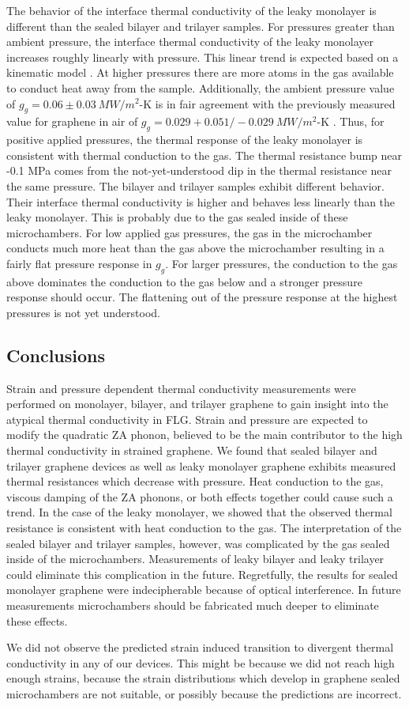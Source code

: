 The behavior of the interface thermal conductivity of the leaky monolayer is different than the sealed bilayer and trilayer samples.
For pressures greater than ambient pressure, the interface thermal conductivity of the leaky monolayer increases roughly linearly with pressure.
This linear trend is expected based on a kinematic model \cite{Chen2011a}.
At higher pressures there are more atoms in the gas available to conduct heat away from the sample.
Additionally, the ambient pressure value of $g_g = 0.06 \pm 0.03 \ MW/m^2$-K is in fair agreement with the previously measured value for graphene in air of $g_g = 0.029+0.051/-0.029 \ MW/m^2$-K \cite{Chen2011a}.
Thus, for positive applied pressures, the thermal response of the leaky monolayer is consistent with thermal conduction to the gas.
The thermal resistance bump near -0.1 MPa comes from the not-yet-understood dip in the thermal resistance near the same pressure.
The bilayer and trilayer samples exhibit different behavior.
Their interface thermal conductivity is higher and behaves less linearly than the leaky monolayer.
This is probably due to the gas sealed inside of these microchambers.
For low applied gas pressures, the gas in the microchamber conducts much more heat than the gas above the microchamber resulting in a fairly flat pressure response in $g_g$.
For larger pressures, the conduction to the gas above dominates the conduction to the gas below and a stronger pressure response should occur.
The flattening out of the pressure response at the highest pressures is not yet understood.

\subsection{Conclusions}
Strain and pressure dependent thermal conductivity measurements were performed on monolayer, bilayer, and trilayer graphene to gain insight into the atypical thermal conductivity in FLG.
Strain and pressure are expected to modify the quadratic ZA phonon, believed to be the main contributor to the high thermal conductivity in strained graphene.
We found that sealed bilayer and trilayer graphene devices as well as leaky monolayer graphene exhibits measured thermal resistances which decrease with pressure.
Heat conduction to the gas, viscous damping of the ZA phonons, or both effects together could cause such a trend.
In the case of the leaky monolayer, we showed that the observed thermal resistance is consistent with heat conduction to the gas.
The interpretation of the sealed bilayer and trilayer samples, however, was complicated by the gas sealed inside of the microchambers.
Measurements of leaky bilayer and leaky trilayer could eliminate this complication in the future.
Regretfully, the results for sealed monolayer graphene were indecipherable because of optical interference.
In future measurements microchambers should be fabricated much deeper to eliminate these effects.

We did not observe the predicted strain induced transition to divergent thermal conductivity \cite{Bonini2012,Pereira2013} in any of our devices.
This might be because we did not reach high enough strains, because the strain distributions which develop in graphene sealed microchambers are not suitable, or possibly because the predictions are incorrect.